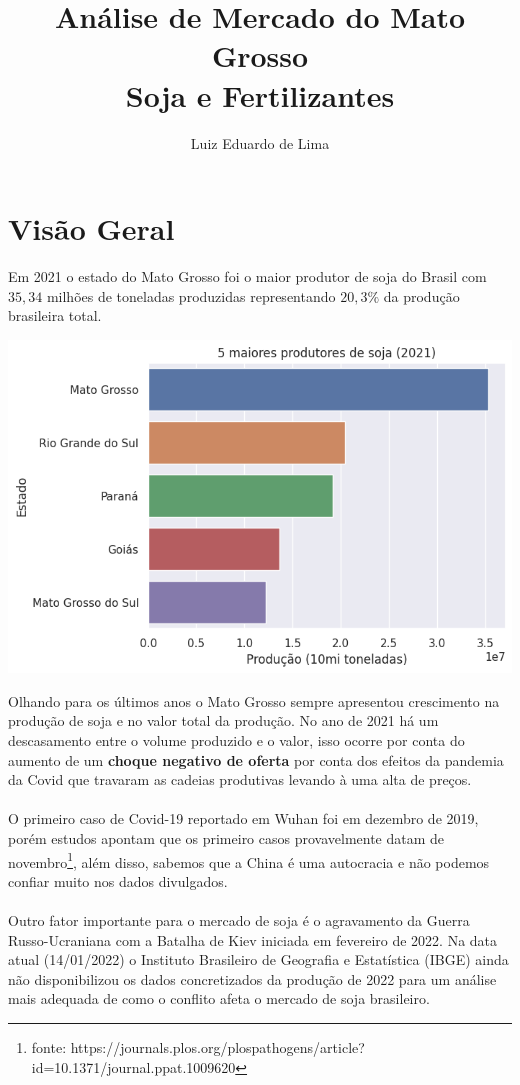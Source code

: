 \documentclass{article}
\title{Análise de Mercado do Mato Grosso \\
 Soja e Fertilizantes}
\author{Luiz Eduardo de Lima}
\date{}
\begin{document}
\maketitle

\section*{Visão Geral}
Em 2021 o estado do Mato Grosso foi o maior produtor de soja do Brasil com $35,34$ milhões de toneladas produzidas representando $20,3\%$ da produção brasileira total.
\begin{center}
\includegraphics[scale=0.6]{top5_prod_soja_br.png}
\end{center}
Olhando para os últimos anos o Mato Grosso sempre apresentou crescimento na produção de soja e no valor total da produção. No ano de 2021 há um descasamento entre o volume produzido e o valor, isso ocorre por conta do aumento de um \textbf{choque negativo de oferta} por conta dos efeitos da pandemia da Covid que travaram as cadeias produtivas levando à uma alta de preços.
\\~\\
O primeiro caso de Covid-19 reportado em Wuhan foi em dezembro de 2019, porém estudos apontam que os primeiro casos provavelmente datam de novembro\footnote{fonte: https://journals.plos.org/plospathogens/article?id=10.1371/journal.ppat.1009620}, além disso, sabemos que a China é uma autocracia e não podemos confiar muito nos dados divulgados.
\\~\\
Outro fator importante para o mercado de soja é o agravamento da Guerra Russo-Ucraniana com a Batalha de Kiev iniciada em fevereiro de 2022. Na data atual (14/01/2022) o Instituto Brasileiro de Geografia e Estatística (IBGE) ainda não disponibilizou os dados concretizados da produção de 2022 para um análise mais adequada de como o conflito afeta o mercado de soja brasileiro.
\end{document}
